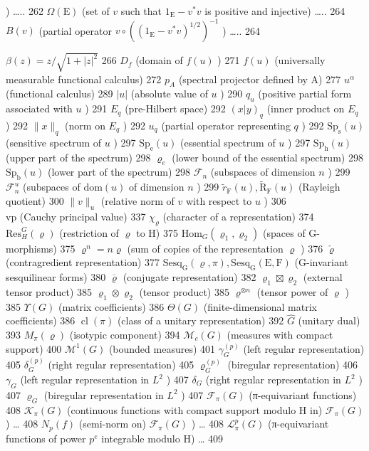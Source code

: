 ) \ldots.. 262 \(\Omega(\mathrm{E})\) (set of \(v\) such that \(1_{\mathrm{E}} - v^*v\) is positive and injective) \ldots.. 264 \(B(v)\) (partial operator \(v\circ((1_{\mathrm{E}} - v^*v)^{1/2})^{-1}\) ) \ldots.. 264

\(\beta (z) = z / \sqrt{1 + |z|^2}\) 266 \(D_f\) (domain of \(f(u)\) ) 271 \(f(u)\) (universally measurable functional calculus) 272 \(p_A\) (spectral projector defined by A) 277 \(u^\alpha\) (functional calculus) 289 \(|u|\) (absolute value of \(u\) ) 290 \(q_u\) (positive partial form associated with \(u\) ) 291 \(E_q\) (pre-Hilbert space) 292 \((x|y)_q\) (inner product on \(E_q\) ) 292 \(\| x \| _q\) (norm on \(E_q\) ) 292 \(u_q\) (partial operator representing \(q\) ) 292 \(\mathrm{Sp}_{\mathrm{s}}(u)\) (sensitive spectrum of \(u\) ) 297 \(\mathrm{Sp}_{\mathrm{e}}(u)\) (essential spectrum of \(u\) ) 297 \(\mathrm{Sp_h}(u)\) (upper part of the spectrum) 298 \(\varrho_{e}\) (lower bound of the essential spectrum) 298 \(\mathrm{Sp_b}(u)\) (lower part of the spectrum) 298 \(\mathcal{F}_n\) (subspaces of dimension \(n\) ) 299 \(\mathcal{F}_n^u\) (subspaces of \(\mathrm{dom}(u)\) of dimension \(n\) ) 299 \(\widetilde{r}_{\mathrm{F}}(u), \widetilde{\mathrm{R}}_{\mathrm{F}}(u)\) (Rayleigh quotient) 300 \(\|v\|_u\) (relative norm of \(v\) with respect to \(u\) ) 306\\
vp (Cauchy principal value) 337 \(\chi_\varrho\) (character of a representation) 374 \(\mathrm{Res}_{H}^{G}(\varrho)\) (restriction of \(\varrho\) to H) 375 \(\mathrm{Hom}_{G}(\varrho_1,\varrho_2)\) (spaces of G-morphisms) 375 \(\varrho^n = n \varrho\) (sum of copies of the representation \(\varrho\) ) 376 \(\check{\varrho}\) (contragredient representation) 377 \(\mathrm{Sesq_G}(\varrho, \pi), \mathrm{Sesq_G(E,F)}\) (G-invariant sesquilinear forms) 380 \(\overline{\varrho}\) (conjugate representation) 382 \(\varrho_1 \boxtimes \varrho_2\) (external tensor product) 385 \(\varrho_1 \otimes \varrho_2\) (tensor product) 385 \(\varrho^{\otimes n}\) (tensor power of \(\varrho\) ) 385 \(\Upsilon(G)\) (matrix coefficients) 386 \(\Theta(G)\) (finite-dimensional matrix coefficients) 386 \(\operatorname{cl}(\pi)\) (class of a unitary representation) 392 \(\widehat{G}\) (unitary dual) 393 \(M_\pi (\varrho)\) (isotypic component) 394 \(\mathcal{M}_c(G)\) (measures with compact support) 400 \(\mathcal{M}^1(G)\) (bounded measures) 401 \(\gamma_{G}^{(p)}\) (left regular representation) 405 \(\delta_{G}^{(p)}\) (right regular representation) 405 \(\varrho_{G}^{(p)}\) (biregular representation) 406 \(\gamma_{G}\) (left regular representation in \(L^2\) ) 407 \(\delta_{G}\) (right regular representation in \(L^2\) ) 407 \(\varrho_{G}\) (biregular representation in \(L^2\) ) 407 \(\mathcal{F}_{\pi}(G)\) (π-equivariant functions) 408 \(\mathcal{K}_{\pi}(G)\) (continuous functions with compact support modulo H in) \(\mathcal{F}_{\pi}(G)\) ) \ldots{} 408 \(N_p(f)\) (semi-norm on) \(\mathcal{F}_π(G)\) ) \ldots{} 408 \(\mathcal{L}_{\pi}^{p}(G)\) (π-equivariant functions of power \(p^e\) integrable modulo H) \ldots{} 409

